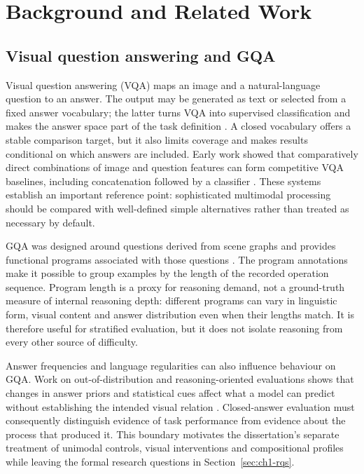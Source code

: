 \chapter{Background and Related Work}

\section{Visual question answering and GQA}
\label{sec:ch2-vqa}

Visual question answering (VQA) maps an image and a natural-language question to an answer. The output may be generated as text or selected from a fixed answer vocabulary; the latter turns VQA into supervised classification and makes the answer space part of the task definition \citep{antol2015vqa}. A closed vocabulary offers a stable comparison target, but it also limits coverage and makes results conditional on which answers are included. Early work showed that comparatively direct combinations of image and question features can form competitive VQA baselines, including concatenation followed by a classifier \citep{zhou2015ibowimg,jabri2016revisiting}. These systems establish an important reference point: sophisticated multimodal processing should be compared with well-defined simple alternatives rather than treated as necessary by default.

GQA was designed around questions derived from scene graphs and provides functional programs associated with those questions \citep{hudson2019gqa}. The program annotations make it possible to group examples by the length of the recorded operation sequence. Program length is a proxy for reasoning demand, not a ground-truth measure of internal reasoning depth: different programs can vary in linguistic form, visual content and answer distribution even when their lengths match. It is therefore useful for stratified evaluation, but it does not isolate reasoning from every other source of difficulty.

Answer frequencies and language regularities can also influence behaviour on GQA. Work on out-of-distribution and reasoning-oriented evaluations shows that changes in answer priors and statistical cues affect what a model can predict without establishing the intended visual relation \citep{kervadec2021gqaood,kervadec2021reasoning}. Closed-answer evaluation must consequently distinguish evidence of task performance from evidence about the process that produced it. This boundary motivates the dissertation's separate treatment of unimodal controls, visual interventions and compositional profiles while leaving the formal research questions in Section~\ref{sec:ch1-rqs}.


